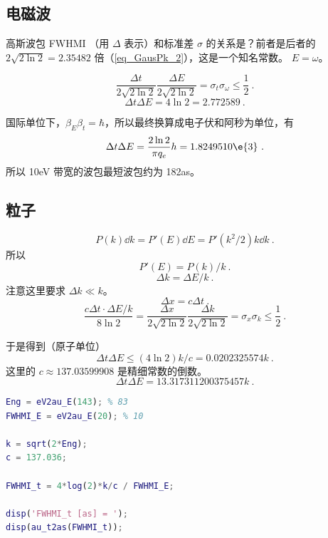 
\subsection{电磁波}
高斯波包 FWHMI （用 $\Delta$ 表示）和标准差 $\sigma$ 的关系是？前者是后者的 $2\sqrt{2\ln 2} = 2.35482$ 倍（\autoref{eq_GausPk_2}），这是一个知名常数。
$E = \omega$。

\begin{equation}
\frac{\Delta t}{2\sqrt{2\ln 2}}\frac{\Delta E}{2\sqrt{2\ln 2}} = \sigma_t \sigma_\omega \leq \frac{1}{2}~.
\end{equation}
\begin{equation}
\Delta t\Delta E = 4\ln 2 = 2.772589~.
\end{equation}

国际单位下，$\beta_E\beta_t = \hbar$，所以最终换算成电子伏和阿秒为单位，有
\begin{equation}
\Delta t \Delta E  = \frac{2\ln 2}{\pi q_e}h = 1.8249510\e{3}~.
\end{equation}
所以 10eV 带宽的波包最短波包约为 182as。

\subsection{粒子}
\begin{equation}
P(k)\dd{k} = P'(E)\dd{E} = P'(k^2/2)k\dd{k}~.
\end{equation}
所以
\begin{equation}
P'(E) = P(k)/k~.
\end{equation}
\begin{equation}
\Delta k = \Delta E/k~.
\end{equation}
注意这里要求 $\Delta k \ll k$。
\begin{equation}
\Delta x = c\Delta t~.
\end{equation}
\begin{equation}
\frac{c\Delta t \cdot \Delta E/k}{8\ln 2} = \frac{\Delta x}{2\sqrt{2\ln 2}}\frac{\Delta k}{2\sqrt{2\ln 2}} = \sigma_x \sigma_k \leq \frac{1}{2}~.
\end{equation}

于是得到（原子单位）
\begin{equation}
\Delta t\Delta E \leq (4\ln 2)k/c = 0.0202325574 k~.
\end{equation}
这里的 $c \approx 137.03599908$ 是精细常数的倒数。
\begin{equation}
\Delta t \Delta E = 13.317311200375457 k~. %
\end{equation}

\begin{lstlisting}[language=matlab]
% 以上计算的 Matlab 代码
Eng = eV2au_E(143); % 83
FWHMI_E = eV2au_E(20); % 10

k = sqrt(2*Eng);
c = 137.036;

FWHMI_t = 4*log(2)*k/c / FWHMI_E;

disp('FWHMI_t [as] = ');
disp(au_t2as(FWHMI_t));
\end{lstlisting}

